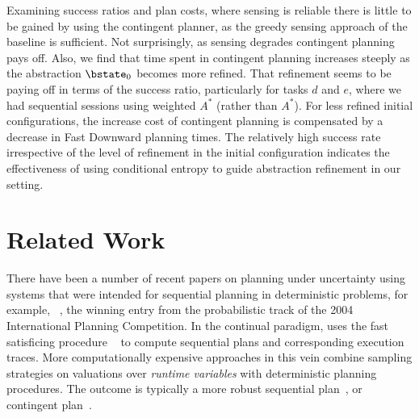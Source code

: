 \documentclass{article}
\begin{document}

Examining success ratios and plan costs, where sensing is reliable
there is little to be gained by using the contingent planner, as the
greedy sensing approach of the baseline is sufficient. Not
surprisingly, as sensing degrades contingent planning pays off.  Also,
we find that time spent in contingent planning increases steeply as
the abstraction $\bstate_0$ becomes more refined.  That refinement
seems to be paying off in terms of the success ratio, particularly for
tasks $d$ and $e$, where we had sequential sessions using weighted
$A^*$ (rather than $A^*$). For less refined initial configurations,
the increase cost of contingent planning is compensated by a decrease
in Fast Downward planning times. The relatively high success rate
irrespective of the level of refinement in the initial configuration
indicates the effectiveness of using conditional entropy to guide
abstraction refinement in our setting.






\section{Related Work}
There have been a number of recent papers on
planning under uncertainty using systems that were intended for
sequential planning in deterministic problems,  for example,
~\cite{yoon:etal:2007}, the winning entry from the
probabilistic track of the 2004 International Planning Competition.
In the continual paradigm,  uses the fast satisficing
procedure ~\cite{hoffmann:nebel:2001} to compute sequential
plans and corresponding execution traces.
More computationally expensive approaches in this vein combine
sampling strategies on valuations over {\em runtime variables} with
deterministic planning procedures. The outcome is typically a more
robust sequential plan~\cite{yoon:etal:2008}, or contingent
plan~\cite{majercik:2006}. 
\end{document}
